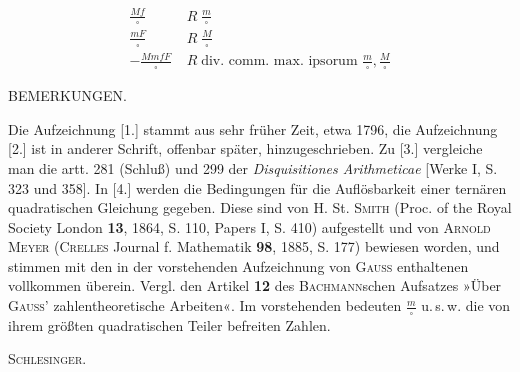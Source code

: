 \[
\boxed{\begin{aligned}
\frac{Mf}{\square}\;&R\;\frac{m}{\square}\\[4pt]
\frac{mF}{\square}\;&R\;\frac{M}{\square}\\[4pt]
-\frac{MmfF}{\square}\;&R\;\text{div. comm. max. ipsorum }\frac{m}{\square},\frac{M}{\square}
\end{aligned}}
\]
\begin{center}\small BEMERKUNGEN.\end{center}
\begingroup\small
\noindent\hspace*{\parindent}Die Aufzeichnung [1.] stammt aus sehr früher Zeit, etwa 1796, die Aufzeichnung [2.] ist in anderer
Schrift, offenbar später, hinzugeschrieben. Zu [3.] vergleiche man die artt. 281 (Schluß) und 299 der
\textit{Disquisitiones Arithmeticae} [Werke I, S. 323 und 358]. In [4.] werden die Bedingungen für die Auflösbarkeit
einer ternären quadratischen Gleichung gegeben. Diese sind von H. St. \textsc{Smith} (Proc. of the Royal
Society London \textbf{13}, 1864, S. 110, Papers I, S. 410) aufgestellt und von \textsc{Arnold Meyer} (\textsc{Crelles} Journal
f. Mathematik \textbf{98}, 1885, S. 177) bewiesen worden, und stimmen mit den in der vorstehenden Aufzeichnung
von \textsc{Gauss} enthaltenen vollkommen überein. Vergl. den Artikel \textbf{12} des \textsc{Bachmann}schen Aufsatzes »Über
\textsc{Gauss}’ zahlentheoretische Arbeiten«. Im vorstehenden bedeuten $\frac{m}{\square}$ u.\,s.\,w. die von ihrem größten quadratischen
Teiler befreiten Zahlen.
\par\hfill\textsc{Schlesinger.}\par
\endgroup
\ClosingRule
\clearpage

